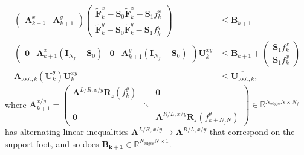 \begin{align}
\begin{pmatrix}
\bm{A}_{k+1}^{x}&\bm{A}_{k+1}^{y}\end{pmatrix} 
\begin{pmatrix}
\tilde{\bm{F}}^x_{k} - \bm{S}_0\tilde{\bm{F}}^x_{k} - \bm{S}_1f^x_k\\
\tilde{\bm{F}}^y_{k} - \bm{S}_0\tilde{\bm{F}}^y_{k} - \bm{S}_1f^y_k
\end{pmatrix} &\leq \bm{B}_{k+1} \\
\begin{pmatrix}
\bm{0} & \bm{A}_{k+1}^{x}(\textbf{I}_{N_f}-\bm{S}_0) & \bm{0} & \bm{A}_{k+1}^{y}(\textbf{I}_{N_f}-\bm{S}_0)
\end{pmatrix}\bm{U}_k^{xy} &\leq \bm{B}_{k+1}+\begin{pmatrix}
\bm{S}_1f_k^x \\ \bm{S}_1f_k^x 
\end{pmatrix}\\
\bm{A}_{\text{foot},k}(\bm{U}_k^\theta)\bm{U}_k^{xy} &\leq \overline{\bm{U}_{\text{foot},k}},
\label{eq::212_ineq_foot}
\end{align}
where $\bm{A}_{k+1}^{x/y}=\begin{pmatrix}
	\bm{A}^{L/R,x/y}\bm{R}_z(f_{k}^\theta)& & \bm{0} \\
	&\ddots &\\
	\bm{0} &           &\bm{A}^{R/L,x/y}\bm{R}_z(f_{k+N_fN}^\theta)
\end{pmatrix}\in\mathbb{R}^{N_\text{edges}N\times N_f}$ has alternating linear inequalities $\bm{A}^{L/R,x/y}\rightarrow\bm{A}^{R/L,x/y}$ that correspond on the support foot, and so does $\bm{B_{k+1}}\in\mathbb{R}^{N_\text{edges}N\times1}$. 

